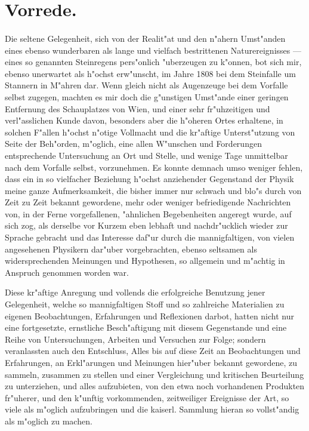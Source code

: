 \documentclass[a4paper, 11pt, oneside, german]{article}
\begin{document}
\section*{Vorrede.}
\paragraph{}
Die seltene Gelegenheit, sich von der Realit"at und den n"ahern Umst"anden eines ebenso wunderbaren als lange und vielfach bestrittenen Naturereignisses --- eines so genannten Steinregens pers"onlich "uberzeugen zu k"onnen, bot sich mir, ebenso unerwartet als h"ochst erw"unscht, im Jahre 1808 bei dem Steinfalle um Stannern in M"ahren dar. Wenn gleich nicht als Augenzeuge bei dem Vorfalle selbst zugegen, machten es mir doch die g"unstigen Umst"ande einer geringen Entfernung des Schauplatzes von Wien, und einer sehr fr"uhzeitigen und verl"asslichen Kunde davon, besonders aber die h"oheren Ortes erhaltene, in solchen F"allen h"ochst n"otige Vollmacht und die kr"aftige Unterst"utzung von Seite der Beh"orden, m"oglich, eine allen W"unschen und Forderungen entsprechende Untersuchung an Ort und Stelle, und wenige Tage unmittelbar nach dem Vorfalle selbst, vorzunehmen. Es konnte demnach umso weniger fehlen, dass ein in so vielfacher Beziehung h"ochst anziehender Gegenstand der Physik meine ganze Aufmerksamkeit, die bisher immer nur schwach und blo"s durch von Zeit zu Zeit bekannt gewordene, mehr oder weniger befriedigende Nachrichten von, in der Ferne vorgefallenen, "ahnlichen Begebenheiten angeregt wurde, auf sich zog, als derselbe vor Kurzem eben lebhaft und nachdr"ucklich wieder zur Sprache gebracht und das Interesse daf"ur durch die mannigfaltigen, von vielen angesehenen Physikern dar"uber vorgebrachten, ebenso seltsamen als widersprechenden Meinungen und Hypothesen, so allgemein und m"achtig in Anspruch genommen worden war.

Diese kr"aftige Anregung und vollends die erfolgreiche Benutzung jener Gelegenheit, welche so mannigfaltigen Stoff und so zahlreiche Materialien zu eigenen Beobachtungen, Erfahrungen und Reflexionen darbot, hatten nicht nur eine fortgesetzte, ernstliche Besch"aftigung mit diesem Gegenstande und eine Reihe von Untersuchungen, Arbeiten und Versuchen zur Folge; sondern veranlassten auch den Entschluss, Alles bis auf diese Zeit an Beobachtungen und Erfahrungen, an Erkl"arungen und Meinungen hier"uber bekannt gewordene, zu sammeln, zusammen zu stellen und einer Vergleichung und kritischen Beurteilung zu unterziehen, und alles aufzubieten, von den etwa noch vorhandenen Produkten fr"uherer, und den k"unftig vorkommenden, zeitweiliger Ereignisse der Art, so viele als m"oglich aufzubringen und die kaiserl. Sammlung hieran so vollst"andig als m"oglich zu machen.
\end{document}
